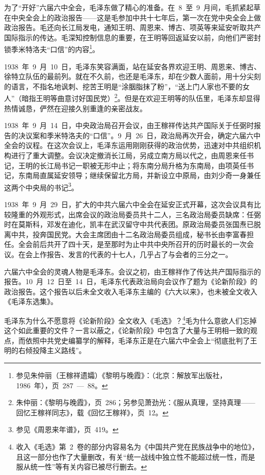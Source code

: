 为了“开好”六届六中全会，毛泽东做了精心的准备。在~8~至~9~月间，毛抓紧起草在中央全会上的政治报告——这是毛参加中共十七年后，第一次在党中央全会上做政治报告。毛还向长江局发电，通知王明、周恩来、博古、项英等来延安听取共产国际指示的传达。毛深知控制信息的重要，在王明等回返延安以前，向他们严密封锁季米特洛夫“口信”的内容\footnote{参见朱仲丽（王稼祥遗孀）《黎明与晚霞》：（北京：解放军出版社，1986~年），页~287~—~88。}。

1938~年~9~月~10~日，毛泽东笑容满面，站在延安各界欢迎王明、周恩来、博古、徐特立队伍的最前列。就在不久前，也还是毛泽东，却在少数人面前，用十分尖刻的语言，不指名地讽刺、挖苦王明是“涂胭脂抹了粉”，“送上门人家也不要的女人”（暗指王明等曲意讨好国民党）\footnote{朱仲丽：《黎明与晚霞》，页~286；另参见萧劲光：《服从真理，坚持真理——回忆王稼祥同志》，载《回忆王稼祥》，页~12。}。但是在欢迎王明等的队伍里，毛泽东却显得热情诚恳，俨然在迎接久别重逢的亲密战友。

1938~年~9~月~14~日，中央政治局召开会议，由王稼祥传达共产国际关于任弼时报告的决议案和季米特洛夫的“口信”。9~月~26~日，政治局再次开会，确定六届六中全会的议程。在这次会议上，毛泽东运用刚刚获得的政治优势，迅速对中共组织机构进行了重大调整。会议决定撤消长江局，另成立南方局以代之，由周恩来任书记，王明的长江局书记一职被无形中止；将东南分局升格为东南局，由项英任书记，东南局直属延安领导；继续保留北方局，并新设立中原局，由刘少奇一身兼任这两个中央局的书记\footnote{参见《周恩来年谱》，页~419。}。

1938~年~9~月~29~日，扩大的中共六届六中全会在延安正式开幕，这次会议具有比较隆重的外观形式，出席会议的政治局委员共十二人，三名政治局委员缺席：任弼时在莫斯科，邓发在迪化，凯丰在武汉留守中共代表团。原政治局委员张国焘已脱离中共，投奔国民党。大会主席团由十二名政治局委员组成，秘书长由李富春担任。全会前后共开了四十天，是至那时为止中共中央所召开的历时最长的一次会议。在会上作报告、发言的代表的十七人，几乎占了与会者的三分之一。

六届六中全会的灵魂人物是毛泽东。会议之初，由王稼祥作了传达共产国际指示的报告。10~月~12~日至~14~日，毛泽东代表政治局向会议作了题为《论新阶段》的政治报告。这个报告以后未全文收入毛泽东主编的《六大以来》，也未被全文收入《毛泽东选集》。

毛泽东为什么不愿意将《论新阶段》全文收入《毛选》？\footnote{收入《毛选》第~2~卷的部分内容易名为《中国共产党在民族战争中的地位》，且这一部分也作了大量删改，有关“统一战线中独立性不能超过统一性，而是服从统一性”等有关内容已被尽行删去。}毛为什么意欲人们忘掉这个如此重要的文件？一言以蔽之，《论新阶段》中包含了大量与王明相一致的观点，而依照中共党史编纂学的解释，毛泽东正是在六届六中全会上“彻底批判了王明的右倾投降主义路线”。

